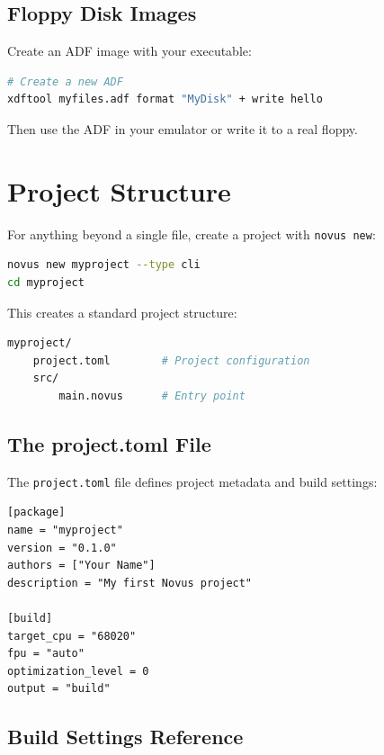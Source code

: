 \subsection{Floppy Disk Images}

Create an ADF image with your executable:

\begin{lstlisting}[language=bash]
# Create a new ADF
xdftool myfiles.adf format "MyDisk" + write hello
\end{lstlisting}

Then use the ADF in your emulator or write it to a real floppy.

\section{Project Structure}
\label{sec:project-structure}

For anything beyond a single file, create a project with \texttt{novus new}:

\begin{lstlisting}[language=bash]
novus new myproject --type cli
cd myproject
\end{lstlisting}

This creates a standard project structure:

\begin{lstlisting}[language=bash]
myproject/
    project.toml        # Project configuration
    src/
        main.novus      # Entry point
\end{lstlisting}

\subsection{The project.toml File}

The \texttt{project.toml} file defines project metadata and build settings:

\begin{lstlisting}
[package]
name = "myproject"
version = "0.1.0"
authors = ["Your Name"]
description = "My first Novus project"

[build]
target_cpu = "68020"
fpu = "auto"
optimization_level = 0
output = "build"
\end{lstlisting}

\subsection{Build Settings Reference}

